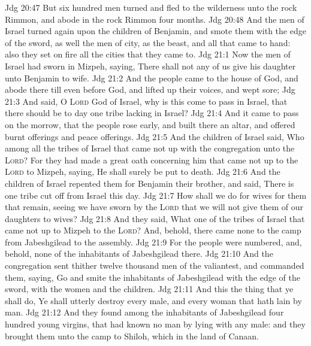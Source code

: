 \vs Jdg 20:47 But six hundred men turned and fled to the wilderness unto the rock Rimmon, and abode in the rock Rimmon four months.
\vs Jdg 20:48 And the men of Israel turned again upon the children of Benjamin, and smote them with the edge of the sword, as well the men of  city, as the beast, and all that came to hand: also they set on fire all the cities that they came to.
\vs Jdg 21:1 Now the men of Israel had sworn in Mizpeh, saying, There shall not any of us give his daughter unto Benjamin to wife.
\vs Jdg 21:2 And the people came to the house of God, and abode there till even before God, and lifted up their voices, and wept sore;
\vs Jdg 21:3 And said, O \textsc{Lord} God of Israel, why is this come to pass in Israel, that there should be to day one tribe lacking in Israel?
\vs Jdg 21:4 And it came to pass on the morrow, that the people rose early, and built there an altar, and offered burnt offerings and peace offerings.
\vs Jdg 21:5 And the children of Israel said, Who  among all the tribes of Israel that came not up with the congregation unto the \textsc{Lord}? For they had made a great oath concerning him that came not up to the \textsc{Lord} to Mizpeh, saying, He shall surely be put to death.
\vs Jdg 21:6 And the children of Israel repented them for Benjamin their brother, and said, There is one tribe cut off from Israel this day.
\vs Jdg 21:7 How shall we do for wives for them that remain, seeing we have sworn by the \textsc{Lord} that we will not give them of our daughters to wives?
\vs Jdg 21:8 And they said, What one  of the tribes of Israel that came not up to Mizpeh to the \textsc{Lord}? And, behold, there came none to the camp from Jabeshgilead to the assembly.
\vs Jdg 21:9 For the people were numbered, and, behold,  none of the inhabitants of Jabeshgilead there.
\vs Jdg 21:10 And the congregation sent thither twelve thousand men of the valiantest, and commanded them, saying, Go and smite the inhabitants of Jabeshgilead with the edge of the sword, with the women and the children.
\vs Jdg 21:11 And this  the thing that ye shall do, Ye shall utterly destroy every male, and every woman that hath lain by man.
\vs Jdg 21:12 And they found among the inhabitants of Jabeshgilead four hundred young virgins, that had known no man by lying with any male: and they brought them unto the camp to Shiloh, which  in the land of Canaan.
